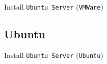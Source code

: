 \documentclass{beamer}
\begin{document}
\begin{frame}{Install \texttt{Ubuntu Server} (\texttt{VMWare})}
\begin{center}
\begin{figure}
\begin{overprint}
      \end{overprint}      
    \end{figure}
  \end{center}
\end{frame}

\subsection{Ubuntu}
\begin{frame}{Install \texttt{Ubuntu Server} (\texttt{Ubuntu})}
  \begin{figure}
    \begin{overprint}
      \setlength{\fboxsep}{0pt}%
      \setlength{\fboxrule}{0.5pt}%
      \centering{}
      \centering{}
      \centering{}

\end{overprint}
\end{figure}
\end{frame}
\end{document}
